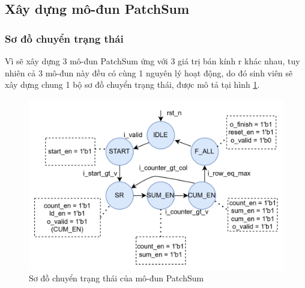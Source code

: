 \subsection{Xây dựng mô-đun PatchSum}
\subsubsection{Sơ đồ chuyển trạng thái}
Vì sẽ xây dựng 3 mô-đun PatchSum ứng với 3 giá trị bán kính r khác nhau, tuy nhiên cả 3 mô-đun này đều có cùng 1 nguyên lý hoạt động, do đó sinh viên sẽ xây dựng chung 1 bộ sơ đồ chuyển trạng thái, được mô tả tại hình \ref{fig:patchSumTrans}. 

\begin{figure}[!ht]
	\centering
	\includegraphics[width=0.8\linewidth]{figures/patchSumTrans.png}
	\caption{Sơ đồ chuyển trạng thái của mô-đun PatchSum}
	\label{fig:patchSumTrans}
\end{figure}

